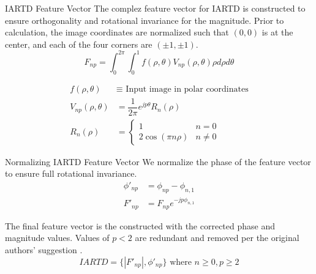 \documentclass[presentation, aspectratio=1610]{beamer}
\begin{document}
\begin{frame}[label={sec:org9e15a51}]{IARTD Feature Vector}
The complez feature vector for IARTD is constructed to ensure orthogonality and rotational invariance for the magnitude. Prior to calculation, the image coordinates are normalized such that \((0,0)\) is at the center, and each of the four corners are \((\pm 1, \pm 1)\).
\begin{equation}
  F_{np} = \int_{0}^{2\pi}\int_{0}^{1} f(\rho,\theta)V_{np}(\rho,\theta)\rho d\rho d\theta
\end{equation}


\begin{equation}
	\begin{split}
		f(\rho,\theta) & \equiv \text{ Input image in polar coordinates}  \\
		V_{np}(\rho,\theta)         & = \dfrac{1}{2\pi}e^{jp\theta}R_{n}(\rho)      \\
		R_{n}(\rho)    & =
		\begin{cases}
			1                   & n=0     \\
			2 \cos (\pi n \rho) & n \ne 0
		\end{cases}
	\end{split}
\end{equation}
\end{frame}
\begin{frame}[label={sec:org864d1d0}]{Normalizing IARTD Feature Vector}
We normalize the phase of the feature vector to ensure full rotational invariance.
\begin{equation}
  \begin{split}
    \phi'_{np} &= \phi_{np}-\phi_{n,1} \\
    F'_{np} &= F_{np}e^{-jp\phi_{n,1}}
  \end{split}
\end{equation}

The final feature vector is the constructed with the corrected phase and magnitude values. Values of \(p<2\) are redundant and removed per the original authors' suggestion \autocite{leeNewShapeDescription2012}.
\begin{equation}
  IARTD = \{|F'_{np}|,\phi'_{np}\} \text{ where } n\ge0,p\ge2
\end{equation}
\end{frame}
\end{document}
